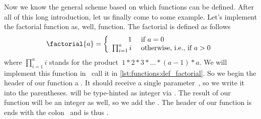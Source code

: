 %
%
%
%
Now we know the general scheme based on which functions can be defined.
After all of this long introduction, let us finally come to some example.
Let's implement the factorial function as, well, function.
The factorial is defined as follows~\cite{D1991TEHOTFF,CB2022FBDOTFF}%
%
\begin{equation}%
\factorial{a}=\left\{\begin{array}{rl}%
1&\textnormal{~if~}a = 0\\%
\prod_{i=1}^a i&\textnormal{~otherwise, i.e., if~}a>0%
\end{array}\right.%
\label{eq:factorial}%
\end{equation}%
%
where $\prod_{i=1}^a i$ stands for the product~$1*2*3*\dots*(a-1)*a$.
We will implement this function in \python\ call it  in \cref{lst:functions:def_factorial}.
So we begin the header of our function a .
It should receive a single parameter~, so we write it into the parentheses.
 will be type-hinted as integer via .
The result of our function will be an integer as well, so we add the  .
The header of our function is ends with the colon~\pythonil{:} and is thus .

